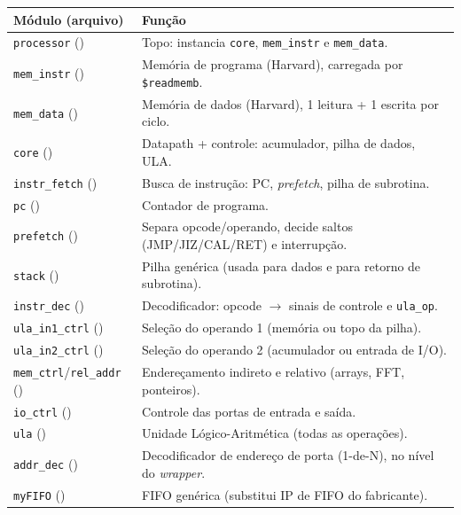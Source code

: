 \begin{longtable}{l l}
\toprule
\textbf{Módulo (arquivo)} & \textbf{Função} \\
\midrule
\endhead
\lstinline|processor| () & Topo: instancia \lstinline|core|, \lstinline|mem_instr| e \lstinline|mem_data|. \\
\lstinline|mem_instr| () & Memória de programa (Harvard), carregada por \lstinline|$readmemb|. \\
\lstinline|mem_data| ()  & Memória de dados (Harvard), 1 leitura + 1 escrita por ciclo. \\
\lstinline|core| ()           & Datapath + controle: acumulador, pilha de dados, ULA. \\
\lstinline|instr_fetch| ()    & Busca de instrução: PC, \emph{prefetch}, pilha de subrotina. \\
\lstinline|pc| ()             & Contador de programa. \\
\lstinline|prefetch| ()       & Separa opcode/operando, decide saltos (JMP/JIZ/CAL/RET) e interrupção. \\
\lstinline|stack| ()          & Pilha genérica (usada para dados e para retorno de subrotina). \\
\lstinline|instr_dec| ()& Decodificador: opcode $\rightarrow$ sinais de controle e \lstinline|ula_op|. \\
\lstinline|ula_in1_ctrl| ()   & Seleção do operando 1 (memória ou topo da pilha). \\
\lstinline|ula_in2_ctrl| ()   & Seleção do operando 2 (acumulador ou entrada de I/O). \\
\lstinline|mem_ctrl|/\lstinline|rel_addr| () & Endereçamento indireto e relativo (arrays, FFT, ponteiros). \\
\lstinline|io_ctrl| ()        & Controle das portas de entrada e saída. \\
\lstinline|ula| ()             & Unidade Lógico-Aritmética (todas as operações). \\
\lstinline|addr_dec| ()  & Decodificador de endereço de porta (1-de-N), no nível do \emph{wrapper}. \\
\lstinline|myFIFO| ()       & FIFO genérica (substitui IP de FIFO do fabricante). \\
\bottomrule
\end{longtable}

